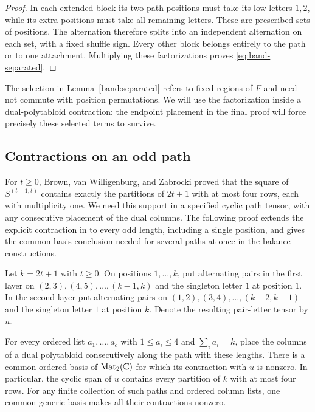 \begin{proof}
In each extended block its two path positions must take its low
letters $1,2$, while its extra positions must take all remaining
letters.  These are prescribed sets of positions.  The alternation
therefore splits into an independent alternation on each set, with
a fixed shuffle sign.  Every other block belongs entirely to the
path or to one attachment.  Multiplying these factorizations proves
\eqref{eq:band-separated}.
\end{proof}

The selection in Lemma~\ref{band:separated} refers to fixed regions
of $F$ and need not commute with position permutations.
We will use the factorization inside a dual-polytabloid contraction:
the endpoint placement in the final proof will force precisely these
selected terms to survive.

\subsection{Contractions on an odd path}

For $t\ge0$, Brown, van Willigenburg, and Zabrocki
\cite[Corollary~4.1]{BWZ} proved that the square of $S^{(t+1,t)}$
contains exactly the partitions of $2t+1$ with at most four rows,
each with multiplicity one.  We need this support in a specified
cyclic path tensor, with any consecutive placement of the dual
columns.  The following proof extends the explicit contraction in
\cite[Section~5]{SaxlCyclic} to every odd length, including a single
position, and gives the common-basis conclusion needed for several
paths at once in the balance constructions.

\begin{lemma}\label{band:path-support}
Let $k=2t+1$ with $t\ge0$.  On positions $1,\ldots,k$, put
alternating pairs in the first layer on
$(2,3),(4,5),\ldots,(k-1,k)$ and the singleton letter $1$ at
position $1$.  In the second layer put alternating pairs on
$(1,2),(3,4),\ldots,(k-2,k-1)$ and the singleton letter $1$ at
position $k$.  Denote the resulting pair-letter tensor by $u$.

For every ordered list $a_1,\ldots,a_c$ with
$1\le a_i\le4$ and $\sum_i a_i=k$, place the columns of a dual
polytabloid consecutively along the path with these lengths.
There is a common ordered basis of $\operatorname{Mat}_2(\mathbb C)$ for which its
contraction with $u$ is nonzero.  In particular, the cyclic span of
$u$ contains every partition of $k$ with at most four rows.
For any finite collection of such paths and ordered column lists,
one common generic basis makes all their contractions nonzero.
\end{lemma}

